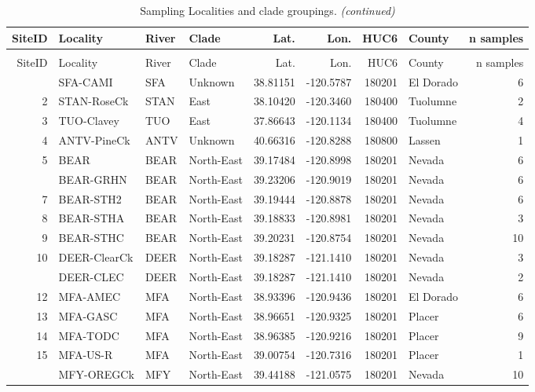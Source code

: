 \documentclass[proquest,12pt,final]{ucthesis-CA2012} %
\begin{document}
\begin{ucmainmatter}
\begingroup\fontsize{7}{9}\selectfont
\begin{longtable}[t]{rlllrrrlr}
\caption{\label{tab:CH3T1}Sampling Localities and clade groupings.}\\
\toprule
SiteID & Locality & River & Clade & Lat. & Lon. & HUC6 & County & n samples\\
\midrule
\endfirsthead
\caption[]{\label{tab:CH3T1}Sampling Localities and clade groupings. \textit{(continued)}}\\
\toprule
SiteID & Locality & River & Clade & Lat. & Lon. & HUC6 & County & n samples\\
\midrule
\endhead
\
\endfoot
\bottomrule
\endlastfoot
1 & SFA-CAMI & SFA & Unknown & 38.81151 & -120.5787 & 180201 & El Dorado & 6\\
2 & STAN-RoseCk & STAN & East & 38.10420 & -120.3460 & 180400 & Tuolumne & 2\\
3 & TUO-Clavey & TUO & East & 37.86643 & -120.1134 & 180400 & Tuolumne & 4\\
4 & ANTV-PineCk & ANTV & Unknown & 40.66316 & -120.8288 & 180800 & Lassen & 1\\
5 & BEAR & BEAR & North-East & 39.17484 & -120.8998 & 180201 & Nevada & 6\\
\addlinespace
6 & BEAR-GRHN & BEAR & North-East & 39.23206 & -120.9019 & 180201 & Nevada & 6\\
7 & BEAR-STH2 & BEAR & North-East & 39.19444 & -120.8878 & 180201 & Nevada & 6\\
8 & BEAR-STHA & BEAR & North-East & 39.18833 & -120.8981 & 180201 & Nevada & 3\\
9 & BEAR-STHC & BEAR & North-East & 39.20231 & -120.8754 & 180201 & Nevada & 10\\
10 & DEER-ClearCk & DEER & North-East & 39.18287 & -121.1410 & 180201 & Nevada & 3\\
\addlinespace
11 & DEER-CLEC & DEER & North-East & 39.18287 & -121.1410 & 180201 & Nevada & 2\\
12 & MFA-AMEC & MFA & North-East & 38.93396 & -120.9436 & 180201 & El Dorado & 6\\
13 & MFA-GASC & MFA & North-East & 38.96651 & -120.9325 & 180201 & Placer & 6\\
14 & MFA-TODC & MFA & North-East & 38.96385 & -120.9216 & 180201 & Placer & 9\\
15 & MFA-US-R & MFA & North-East & 39.00754 & -120.7316 & 180201 & Placer & 1\\
\addlinespace
16 & MFY-OREGCk & MFY & North-East & 39.44188 & -121.0575 & 180201 & Nevada & 10\\

\end{longtable}
\end{ucmainmatter}
\end{document}
